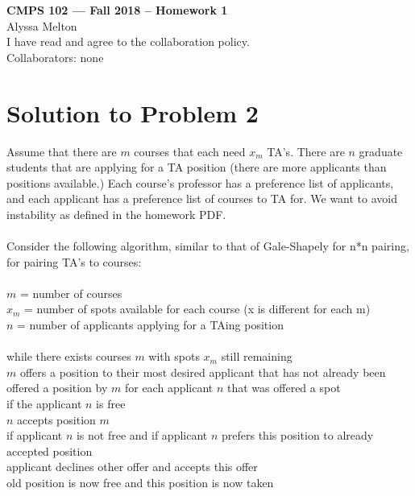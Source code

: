 \documentclass[11pt]{article}
\begin{document}
	
	\begin{center}
		{\bf\Large CMPS 102 --- Fall 2018 --  Homework 1}\\
		Alyssa Melton\\
		I have read and agree to the collaboration policy. \\
		Collaborators: none\\
	\end{center}
	
	
	\section*{Solution to Problem 2}
	
Assume that there are $m$ courses that each need $x_m$ TA's. There are $n$ graduate students that are applying for a TA position (there are more applicants than positions available.) Each course's professor has a preference list of applicants, and each applicant has a preference list of courses to TA for. We want to avoid instability as defined in the homework PDF. \\
\\
Consider the following algorithm, similar to that of Gale-Shapely for n*n pairing, for pairing TA's to courses: \\
\\
$m$ = number of courses\\
$x_m$ = number of spots available for each course (x is different for each m) \\
$n$ = number of applicants applying for a TAing position\\
\\
while there exists courses $m$ with spots $x_m$ still remaining\\
\indent $m$ offers a position to their most desired applicant that has not already been offered a position by $m$
\indent \indent \indent  for each applicant $n$ that was offered a spot\\
\indent \indent \indent \indent if the applicant $n$ is free\\
\indent \indent \indent \indent \indent $n$ accepts position $m$\\
\indent \indent \indent \indent if applicant $n$ is not free and if applicant $n$ prefers this position to already accepted position\\
\indent \indent \indent \indent \indent applicant declines other offer and accepts this offer\\
\indent \indent \indent \indent \indent old position is now free and this position is now taken\\
\end{document}
